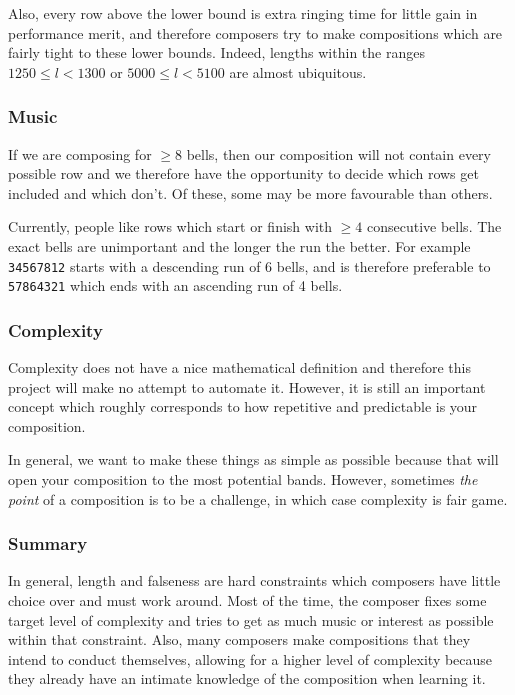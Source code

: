 \documentclass[12pt]{article}
\newcommand{\row}[1]{\texttt{#1}}
\begin{document}
Also, every row above the lower bound is extra ringing time for little gain in performance merit,
and therefore composers try to make compositions which are fairly tight to these lower bounds.
Indeed, lengths within the ranges $1250 \le l < 1300$ or $5000 \le l < 5100$ are almost ubiquitous.

\subsubsection{Music}

If we are composing for $\ge 8$ bells, then our composition will not contain every possible row and
we therefore have the opportunity to decide which rows get included and which don't.  Of these, some
may be more favourable than others.

Currently, people like rows which start or finish with $\ge 4$ consecutive bells.  The exact bells
are unimportant and the longer the run the better.  For example \row{34567812} starts with a
descending run of 6 bells, and is therefore preferable to \row{57864321} which ends with an
ascending run of 4 bells.

\subsubsection{Complexity}

Complexity does not have a nice mathematical definition and therefore this project will make no
attempt to automate it.  However, it is still an important concept which roughly corresponds to how
repetitive and predictable is your composition.

In general, we want to make these things as simple as possible because that will open your
composition to the most potential bands.  However, sometimes \emph{the point} of a composition is to
be a challenge, in which case complexity is fair game.

\subsubsection{Summary}

In general, length and falseness are hard constraints which composers have little choice over and
must work around.  Most of the time, the composer fixes some target level of complexity and tries
to get as much music or interest as possible within that constraint.  Also, many composers make
compositions that they intend to conduct themselves, allowing for a higher level of complexity
because they already have an intimate knowledge of the composition when learning it.
\end{document}
